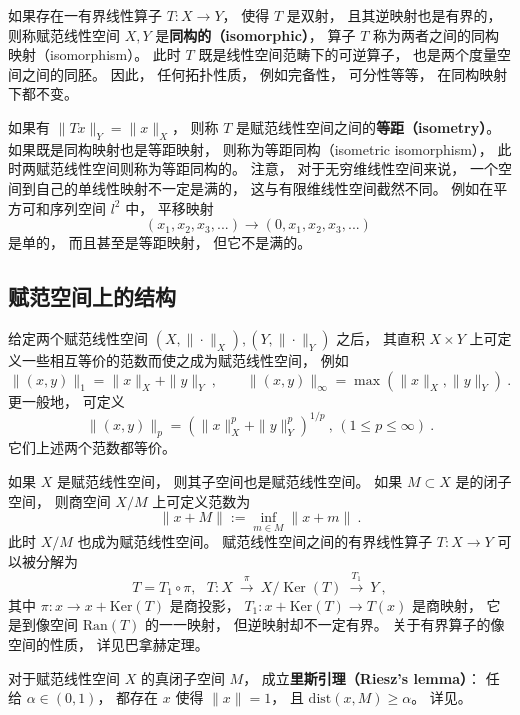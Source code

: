 如果存在一有界线性算子 $T:X\to Y$， 使得 $T$ 是双射， 且其逆映射也是有界的， 则称赋范线性空间 $X,Y$ 是\textbf{同构的（isomorphic）}， 算子 $T$ 称为两者之间的同构映射（isomorphism）。 此时 $T$ 既是线性空间范畴下的可逆算子， 也是两个度量空间之间的同胚。 因此， 任何拓扑性质， 例如完备性， 可分性等等， 在同构映射下都不变。 

如果有 $\|Tx\|_Y=\|x\|_X$， 则称 $T$ 是赋范线性空间之间的\textbf{等距（isometry）}。 如果既是同构映射也是等距映射， 则称为等距同构（isometric isomorphism）， 此时两赋范线性空间则称为等距同构的。 注意， 对于无穷维线性空间来说， 一个空间到自己的单线性映射不一定是满的， 这与有限维线性空间截然不同。 例如在平方可和序列空间 $l^2$ 中， 平移映射
$$
(x_1,x_2,x_3,...)\to(0,x_1,x_2,x_3,...)~
$$
是单的， 而且甚至是等距映射， 但它不是满的。

\subsection{赋范空间上的结构}
给定两个赋范线性空间 $(X,\|\cdot\|_X),(Y,\|\cdot\|_Y)$ 之后， 其直积 $X\times Y$ 上可定义一些相互等价的范数而使之成为赋范线性空间， 例如
$$
\|(x,y)\|_{1}=\|x\|_X+\|y\|_Y~,\qquad \|(x,y)\|_{\infty }=\max(\|x\|_X,\|y\|_Y)~.
$$
更一般地， 可定义
$$
\|(x,y)\|_{p}=\left(\|x\|_X^p+\|y\|_Y^p\right)^{1/p}~,\,(1\leq p\leq\infty)~.
$$
它们上述两个范数都等价。

如果 $X$ 是赋范线性空间， 则其子空间也是赋范线性空间。 如果 $M\subset X$ 是的闭子空间， 则商空间 $X/M$ 上可定义范数为
$$
\|x+M\|:=\inf \limits _{m\in M}\|x+m\|~.
$$
此时 $X/M$ 也成为赋范线性空间。 赋范线性空间之间的有界线性算子 $T:X\to Y$ 可以被分解为
$$
T=T_{1}\circ \pi ,\ \ \ T:X\ {\overset {\pi }{\longrightarrow }}\ X/\operatorname {Ker} (T)\ {\overset {T_{1}}{\longrightarrow }}\ Y~,
$$
其中 $\pi:x\to x+\text{Ker}(T)$ 是商投影， $T_1:x+\text{Ker}(T)\to T(x)$ 是商映射， 它是到像空间 $\text{Ran}(T)$ 的一一映射， 但逆映射却不一定有界。 关于有界算子的像空间的性质， 详见巴拿赫定理。 %

对于赋范线性空间 $X$ 的真闭子空间 $M$， 成立\textbf{里斯引理（Riesz's lemma）}： 任给 $\alpha\in(0,1)$， 都存在 $x$ 使得 $\|x\|=1$， 且 $\text{dist}(x,M)\geq\alpha$。 详见。
